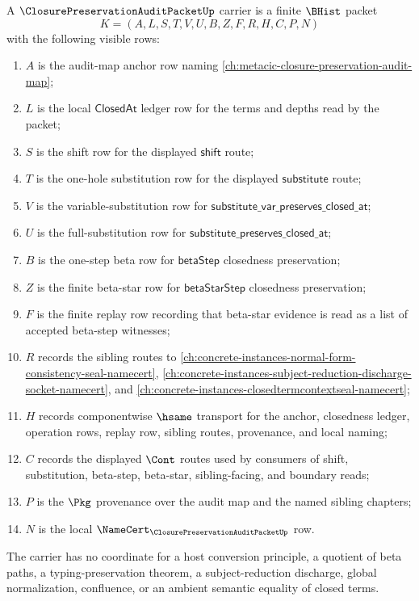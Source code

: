 \begin{definition}
\label{def:closure-preservation-audit-packet-carrier}
A $\ClosurePreservationAuditPacketUp$ carrier is a finite $\BHist$ packet
$$
K=(A,L,S,T,V,U,B,Z,F,R,H,C,P,N)
$$
with the following visible rows:
\begin{enumerate}
\item $A$ is the audit-map anchor row naming \autoref{ch:metacic-closure-preservation-audit-map};
\item $L$ is the local $\mathsf{ClosedAt}$ ledger row for the terms and depths read by the packet;
\item $S$ is the shift row for the displayed $\mathsf{shift}$ route;
\item $T$ is the one-hole substitution row for the displayed $\mathsf{substitute}$ route;
\item $V$ is the variable-substitution row for $\mathsf{substitute\_var\_preserves\_closed\_at}$;
\item $U$ is the full-substitution row for $\mathsf{substitute\_preserves\_closed\_at}$;
\item $B$ is the one-step beta row for $\mathsf{betaStep}$ closedness preservation;
\item $Z$ is the finite beta-star row for $\mathsf{betaStarStep}$ closedness preservation;
\item $F$ is the finite replay row recording that beta-star evidence is read as a list of accepted beta-step witnesses;
\item $R$ records the sibling routes to \autoref{ch:concrete-instances-normal-form-consistency-seal-namecert}, \autoref{ch:concrete-instances-subject-reduction-discharge-socket-namecert}, and \autoref{ch:concrete-instances-closedtermcontextseal-namecert};
\item $H$ records componentwise $\hsame$ transport for the anchor, closedness ledger, operation rows, replay row, sibling routes, provenance, and local naming;
\item $C$ records the displayed $\Cont$ routes used by consumers of shift, substitution, beta-step, beta-star, sibling-facing, and boundary reads;
\item $P$ is the $\Pkg$ provenance over the audit map and the named sibling chapters;
\item $N$ is the local $\NameCert_{\ClosurePreservationAuditPacketUp}$ row.
\end{enumerate}
The carrier has no coordinate for a host conversion principle, a quotient of beta paths, a typing-preservation theorem, a subject-reduction discharge, global normalization, confluence, or an ambient semantic equality of closed terms.
\end{definition}

